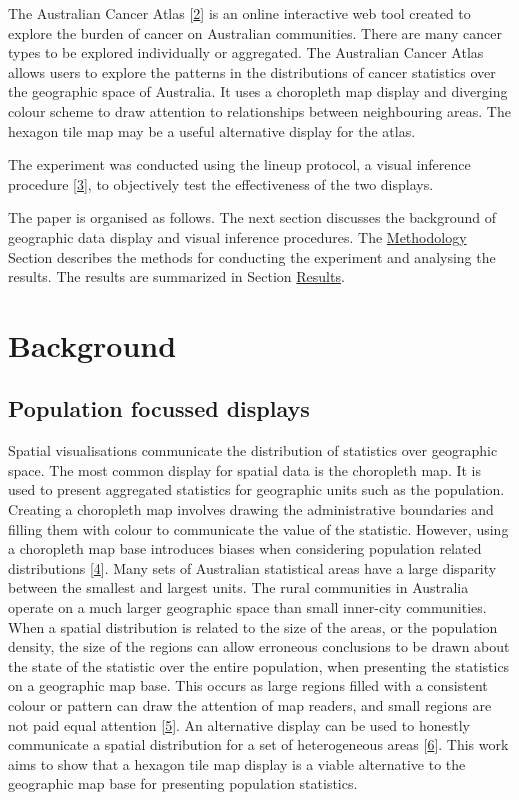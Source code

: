\documentclass[conference,final,]{IEEEtran}
\begin{document}
The Australian Cancer Atlas {[}\protect\hyperlink{ref-atlas}{2}{]} is an online interactive web tool created to explore the burden of cancer on Australian communities. There are many cancer types to be explored individually or aggregated. The Australian Cancer Atlas allows users to explore the patterns in the distributions of cancer statistics over the geographic space of Australia. It uses a choropleth map display and diverging colour scheme to draw attention to relationships between neighbouring areas. The hexagon tile map may be a useful alternative display for the atlas.

The experiment was conducted using the lineup protocol, a visual inference procedure {[}\protect\hyperlink{ref-GIIV}{3}{]}, to objectively test the effectiveness of the two displays.

The paper is organised as follows. The next section discusses the background of geographic data display and visual inference procedures. The \protect\hyperlink{methodology}{Methodology} Section describes the methods for conducting the experiment and analysing the results. The results are summarized in Section \protect\hyperlink{results}{Results}.

\hypertarget{background}{%
\section{Background}\label{background}}

\hypertarget{population-focussed-displays}{%
\subsection{Population focussed displays}\label{population-focussed-displays}}

Spatial visualisations communicate the distribution of statistics over geographic space. The most common display for spatial data is the choropleth map. It is used to present aggregated statistics for geographic units such as the population. Creating a choropleth map involves drawing the administrative boundaries and filling them with colour to communicate the value of the statistic. However, using a choropleth map base introduces biases when considering population related distributions {[}\protect\hyperlink{ref-CBATCC}{4}{]}.
Many sets of Australian statistical areas have a large disparity between the smallest and largest units.
The rural communities in Australia operate on a much larger geographic space than small inner-city communities. When a spatial distribution is related to the size of the areas, or the population density, the size of the regions can allow erroneous conclusions to be drawn about the state of the statistic over the entire population, when presenting the statistics on a geographic map base. This occurs as large regions filled with a consistent colour or pattern can draw the attention of map readers, and small regions are not paid equal attention {[}\protect\hyperlink{ref-CTTMB}{5}{]}. An alternative display can be used to honestly communicate a spatial distribution for a set of heterogeneous areas {[}\protect\hyperlink{ref-NISCC}{6}{]}.
This work aims to show that a hexagon tile map display is a viable alternative to the geographic map base for presenting population statistics.
\end{document}
